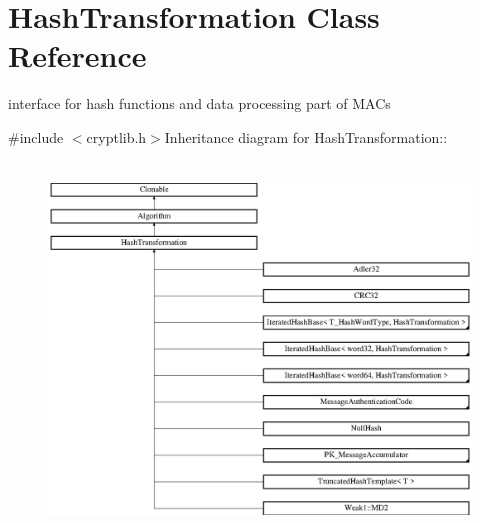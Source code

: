 \hypertarget{class_hash_transformation}{
\section{HashTransformation Class Reference}
\label{class_hash_transformation}
}


interface for hash functions and data processing part of MACs  


{\ttfamily \#include $<$cryptlib.h$>$}Inheritance diagram for HashTransformation::\begin{figure}[H]
\begin{center}
\leavevmode
\includegraphics[height=9.94536cm]{class_hash_transformation}
\end{center}
\end{figure}
